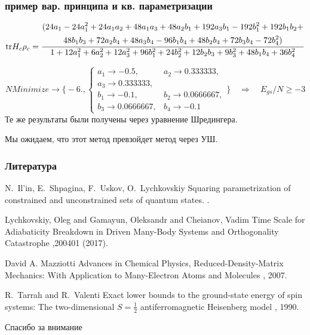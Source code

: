 \documentclass{beamer}
\begin{document}
\begin{frame}
\frametitle{пример вар. принципа и кв. параметризации}
\small
$$\mathrm{tr} H_c\rho_c = \frac{\begin{gathered}(
24 a_1 - 24 a_1^2 + 24 a_1 a_2 + 48 a_1 a_3 + 48 a_2 b_1 + 192 a_3 b_1 - 192 b_1^2 + 192 b_1 b_2 + \\
48 b_1 b_3 + 72 a_2 b_4 + 48 a_3 b_4 - 96 b_1 b_4 + 48 b_2 b_4 + 72 b_3 b_4 - 72 b_4^2)\end{gathered}}
{1 + 12 a_1^2 + 6 a_2^2 + 12 a_3^2 + 96 b_1^2 + 24 b_2^2 + 12 b_2 b_3 + 9 b_3^2 + 48 b_1 b_4 + 36 b_4^2}$$

$$NMinimize\rightarrow\Bigg\{-6., \begin{cases}
a_1 \rightarrow -0.5,&a_2 \rightarrow 0.333333, \\a_3 \rightarrow 0.333333, \\
b_1 \rightarrow -0.1,&b_2 \rightarrow 0.0666667,\\
b_3 \rightarrow 0.0666667, &b_4 \rightarrow -0.1
\end{cases}\Bigg\} \quad\Rightarrow\quad
E_{gs}/N\geqslant -3
$$
\normalsize
Те же результаты были получены через уравнение Шредингера.

Мы ожидаем, что этот метод превзойдет метод через УШ.

\end{frame}


\begin{frame}
\frametitle{Литература}
\footnotesize{
\begin{thebibliography}{99}

N.~Il'in, E.~Shpagina, F.~Uskov, O.~Lychkovskiy
\newblock Squaring parametrization of constrained and
  unconstrained sets of quantum states.
.

Lychkovskiy, Oleg and Gamayun, Oleksandr and Cheianov, Vadim
\newblock Time Scale for Adiabaticity Breakdown in Driven Many-Body Systems and Orthogonality Catastrophe
,200401 (2017).

David A. Mazziotti
\newblock Advances in Chemical Physics, Reduced-Density-Matrix Mechanics: With Application to Many-Electron Atoms and Molecules
, 2007.

R.~Tarrah and R.~Valenti
\newblock Exact lower bounds to the ground-state energy of spin systems: The two-dimensional $S=\frac12$ antiferromagnetic Heisenberg model
, 1990.

\end{thebibliography}
}
\end{frame}

\begin{frame}
\Huge{\centerline{Спасибо за внимание}}
\end{frame}
\end{document}
